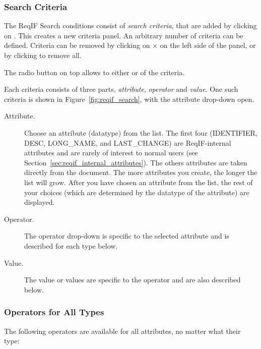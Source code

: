 \subsubsection{Search Criteria}

The ReqIF Search conditions consist of \textit{search criteria}, that are added by clicking on .  This creates a new criteria panel.  An arbitrary number of criteria can be defined.  Criteria can be removed by clicking on $\times$  on the left side of the panel, or by clicking  to remove all.

The radio button on top allows to either  or  of the criteria.

Each criteria consists of three parts, \textit{attribute}, \textit{operator} and \textit{value}.  One such criteria is shown in Figure~\ref{fig:reqif_search}, with the attribute drop-down open.

\begin{description}
\item[Attribute.]  Choose an attribute (datatype) from the list.  The first four (IDENTIFIER, DESC, LONG\_NAME, and LAST\_CHANGE) are ReqIF-internal attributes and are rarely of interest to normal users (see Section~\ref{sec:reqif_internal_attributes}).  The others attributes are taken directly from the document.  The more attributes you create, the longer the list will grow.  After you have chosen an attribute from the list, the rest of your choices (which are determined by the datatype of the attribute) are displayed.
\item[Operator.] The operator drop-down is specific to the selected attribute and is described for each type below.
\item[Value.] The value or values are specific to the operator and are also described below.
\end{description}

\subsubsection{Operators for All Types}

The following operators are available for all attributes, no matter what their type:

